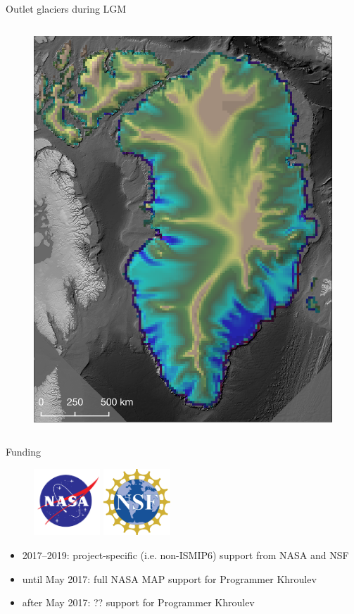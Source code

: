 \documentclass[hide notes,intlimits]{beamer}
\begin{document}
\begin{frame}{Outlet glaciers during LGM}
\begin{columns}
\begin{figure}
      \includegraphics[height=0.7\textheight]{lgm_cc_speed_18000m_sia_ws}
    \end{figure}
  \end{columns}
\end{frame}


\begin{frame}{Funding}
  \begin{figure}
    \includegraphics[height=2.5cm]{nasa-logo} \hspace{1cm}
    \includegraphics[height=2.5cm]{NSF-logo-color}
  \end{figure}
\begin{itemize}
\item 2017--2019: project-specific (i.e. non-ISMIP6) support from NASA and NSF
\item until May 2017: full NASA MAP support for Programmer Khroulev
\item after May 2017: ?? support for Programmer Khroulev
\end{itemize}
\end{frame}
\end{document}
